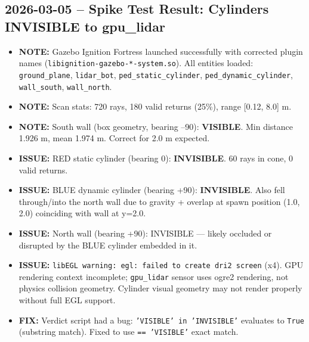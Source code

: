 \documentclass[11pt]{article}
\newcommand{\logentry}[1]{\subsection*{#1}}
\newcommand{\issue}[1]{\textcolor{issuered}{\textbf{ISSUE:} #1}}
\newcommand{\fix}[1]{\textcolor{fixgreen}{\textbf{FIX:} #1}}
\newcommand{\note}[1]{\textcolor{notblue}{\textbf{NOTE:} #1}}
\begin{document}
\logentry{2026-03-05 -- Spike Test Result: Cylinders INVISIBLE to gpu\_lidar}
\begin{itemize}
  \item \note{Gazebo Ignition Fortress launched successfully with corrected plugin names (\texttt{libignition-gazebo-*-system.so}). All entities loaded: \texttt{ground\_plane}, \texttt{lidar\_bot}, \texttt{ped\_static\_cylinder}, \texttt{ped\_dynamic\_cylinder}, \texttt{wall\_south}, \texttt{wall\_north}.}
  \item \note{Scan stats: 720 rays, 180 valid returns (25\%), range [0.12, 8.0] m.}
  \item \note{South wall (box geometry, bearing --90\degree): \textbf{VISIBLE}. Min distance 1.926 m, mean 1.974 m. Correct for 2.0 m expected.}
  \item \issue{RED static cylinder (bearing 0\degree): \textbf{INVISIBLE}. 60 rays in cone, 0 valid returns.}
  \item \issue{BLUE dynamic cylinder (bearing +90\degree): \textbf{INVISIBLE}. Also fell through/into the north wall due to gravity + overlap at spawn position (1.0, 2.0) coinciding with wall at y=2.0.}
  \item \issue{North wall (bearing +90\degree): INVISIBLE --- likely occluded or disrupted by the BLUE cylinder embedded in it.}
  \item \issue{\texttt{libEGL warning: egl: failed to create dri2 screen} (x4). GPU rendering context incomplete; \texttt{gpu\_lidar} sensor uses ogre2 rendering, not physics collision geometry. Cylinder visual geometry may not render properly without full EGL support.}
  \item \fix{Verdict script had a bug: \texttt{'VISIBLE' in 'INVISIBLE'} evaluates to \texttt{True} (substring match). Fixed to use \texttt{== 'VISIBLE'} exact match.}
\end{itemize}
\end{document}
